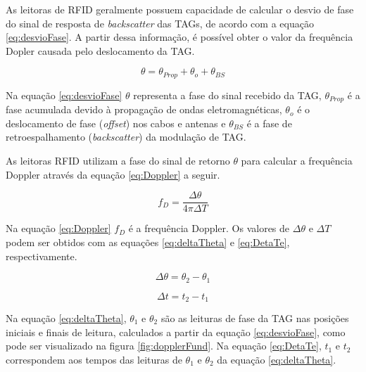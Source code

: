As leitoras de RFID geralmente possuem capacidade de calcular o desvio de fase do sinal de resposta de \textit{backscatter} das TAGs, de acordo com a equação \ref{eq:desvioFase}. A partir dessa informação, é possível obter o valor da frequência Dopler causada pelo deslocamento da TAG. \cite{nikitin2010phase} \cite{tesch2015rfid}

\begin{equation}
    \theta = \theta_{Prop} + \theta_{o} + \theta_{BS}
    \label{eq:desvioFase}
\end{equation}

Na equação \ref{eq:desvioFase} $\theta$ representa a fase do sinal recebido da TAG, $\theta_{Prop}$ é a fase acumulada devido à propagação de ondas eletromagnéticas, $\theta_{o}$ é o deslocamento de fase (\textit{offset}) nos cabos e antenas e $\theta_{BS}$ é a fase de retroespalhamento (\textit{backscatter}) da modulação de TAG. \cite{nikitin2010phase} \cite{tesch2015rfid}

As leitoras RFID utilizam a fase do sinal de retorno $\theta$ para calcular a frequência Doppler através da equação \ref{eq:Doppler} a seguir.\cite{tesch2015rfid}

\begin{equation}
    f_D = \frac{\Delta \theta}{4 \pi \Delta T}
    \label{eq:Doppler}
\end{equation}

Na equação \ref{eq:Doppler} $f_D$ é a frequência Doppler. Os valores de $\Delta \theta$ e $\Delta T$ podem ser obtidos com as equações \ref{eq:deltaTheta} e \ref{eq:DetaTe}, respectivamente.\cite{tesch2015rfid}

\begin{equation}
    \Delta \theta = \theta_2 - \theta_1
    \label{eq:deltaTheta}
\end{equation}

\begin{equation}
    \Delta t = t_2 - t_1
    \label{eq:DetaTe}
\end{equation}

Na equação \ref{eq:deltaTheta}, $\theta_1$ e $\theta_2$ são as leituras de fase da TAG nas posições iniciais e finais de leitura, calculados a partir da equação \ref{eq:desvioFase}, como pode ser visualizado na figura \ref{fig:dopplerFund}. Na equação \ref{eq:DetaTe}, $t_1$ e $t_2$ correspondem aos tempos das leituras de $\theta_1$ e $\theta_2$ da equação \ref{eq:deltaTheta}. \cite{tesch2015rfid}

